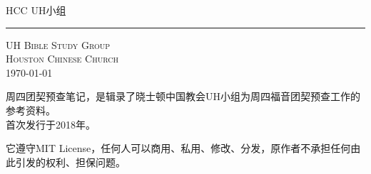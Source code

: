 \documentclass[Chinese,inNight]{CKBib}
\newcommand{\FormedWidth}{\paperwidth}
\newcommand{\FormedHeight}{\paperheight}
\newcommand{\Includepage}[2]{}
\begin{document}
\mainmatter

\thispagestyle{empty}
\pagestyle{empty}
\Includepage{-}{cover.pdf}

\clearpage

\thispagestyle{empty}
\pagestyle{empty}

\begin{center}

\vspace*{0.2in}

\LARGE \SansF HCC UH小组

\vspace*{0.13in}

\HUGE {}

\vspace*{0.18in}

\hrule

\vspace*{0.18in}

\Large 
\begin{minipage}{\textwidth}
\end{minipage}

\normalsize

\vspace*{0.68in}

\scshape UH Bible Study Group\\
Houston Chinese Church\\
\upshape \today
\end{center}

\clearpage

\begin{footnotesize}

\noindent 周四团契预查笔记，是辑录了晓士顿中国教会UH小组为周四福音团契预查工作的参考资料。\\
首次发行于2018年。

\vspace{1em}

\noindent 它遵守MIT License，任何人可以商用、私用、修改、分发，原作者不承担任何由此引发的权利、担保问题。

\end{footnotesize}
\end{document}
